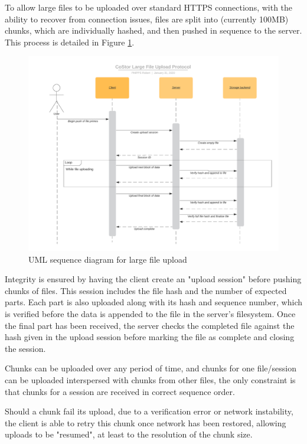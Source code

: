 \documentclass[bsc,frontabs,twoside,singlespacing,parskip,deptreport]{infthesis}     %
\begin{document}
To allow large files to be uploaded over standard HTTPS connections, with the ability to recover
from connection issues, files are split into (currently 100MB) chunks, which are individually
hashed, and then pushed in sequence to the server. This process is detailed in Figure \ref{fig:lfileupload}.

\begin{figure}
	\includegraphics[width=1.1\linewidth]{img/lfileupload.png}
	\caption{UML sequence diagram for large file upload}
	\label{fig:lfileupload}
\end{figure}

Integrity is ensured by having the client create an "upload session" before pushing chunks of
files. This session includes the file hash and the number of expected parts. Each part is also 
uploaded along with its hash and sequence number, which is verified before the data is appended 
to the file in the server's filesystem. Once the final part has been received, the server 
checks the completed file against the hash given in the upload session before marking the file
as complete and closing the session.

Chunks can be uploaded over any period of time, and chunks for one file/session can be uploaded
interspersed with chunks from other files, the only constraint is that chunks for a session are
received in correct sequence order.

Should a chunk fail its upload, due to a verification error or network instability, the client
is able to retry this chunk once network has been restored, allowing uploads to be "resumed", at 
least to the resolution of the chunk size.
\end{document}
